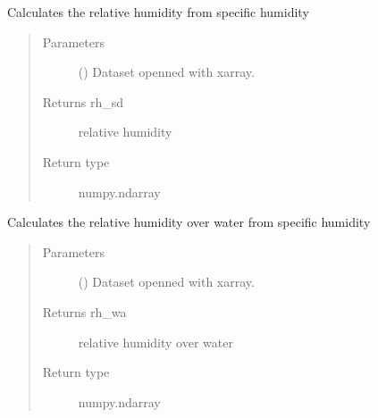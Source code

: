 \documentclass[a4paper,11pt,english]{sphinxmanual}
\begin{document}

\begin{fulllineitems}
\label{\detokenize{envlib:envlib.calc_altrv_vars.get_rh_sd}}
Calculates the relative humidity from specific humidity
\begin{quote}\begin{description}
\item[{Parameters}] \leavevmode
{} () \textendash{} Dataset openned with xarray.

\item[{Returns rh\_sd}] \leavevmode
relative humidity

\item[{Return type}] \leavevmode
numpy.ndarray

\end{description}\end{quote}

\end{fulllineitems}


\begin{fulllineitems}
\label{\detokenize{envlib:envlib.calc_altrv_vars.get_rh_wa}}
Calculates the relative humidity over water from specific humidity
\begin{quote}\begin{description}
\item[{Parameters}] \leavevmode
{} () \textendash{} Dataset openned with xarray.

\item[{Returns rh\_wa}] \leavevmode
relative humidity over water

\item[{Return type}] \leavevmode
numpy.ndarray

\end{description}\end{quote}

\end{fulllineitems}
\end{document}
